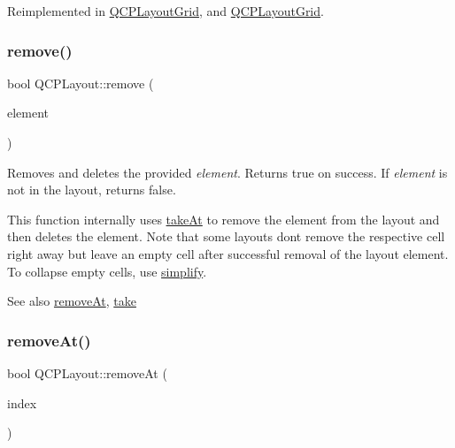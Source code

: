 Reimplemented in \hyperlink{class_q_c_p_layout_grid_a7d5b968b4cf57393e9e387976d91f8f7}{Q\+C\+P\+Layout\+Grid}, and \hyperlink{class_q_c_p_layout_grid_adc2b77187862688f52796d208bd9756c}{Q\+C\+P\+Layout\+Grid}.

\mbox{\label{class_q_c_p_layout_a6c58f537d8086f352576ab7c5b15d0bc}} 
\subsubsection{\texorpdfstring{remove()}{remove()}}
{\footnotesize\ttfamily bool Q\+C\+P\+Layout\+::remove (\begin{DoxyParamCaption}\item[{\hyperlink{class_q_c_p_layout_element}{Q\+C\+P\+Layout\+Element} $\ast$}]{element }\end{DoxyParamCaption})}

Removes and deletes the provided {\itshape element}. Returns true on success. If {\itshape element} is not in the layout, returns false.

This function internally uses \hyperlink{class_q_c_p_layout_a5a79621fa0a6eabb8b520cfc04fb601a}{take\+At} to remove the element from the layout and then deletes the element. Note that some layouts don\textquotesingle{}t remove the respective cell right away but leave an empty cell after successful removal of the layout element. To collapse empty cells, use \hyperlink{class_q_c_p_layout_a41e6ac049143866e8f8b4964efab01b2}{simplify}.

\begin{DoxySeeAlso}{See also}
\hyperlink{class_q_c_p_layout_a2403f684fee3ce47132faaeed00bb066}{remove\+At}, \hyperlink{class_q_c_p_layout_ada26cd17e56472b0b4d7fbbc96873e4c}{take} 
\end{DoxySeeAlso}
\mbox{\label{class_q_c_p_layout_a2403f684fee3ce47132faaeed00bb066}} 
\subsubsection{\texorpdfstring{remove\+At()}{removeAt()}}
{\footnotesize\ttfamily bool Q\+C\+P\+Layout\+::remove\+At (\begin{DoxyParamCaption}\item[{int}]{index }\end{DoxyParamCaption})}

